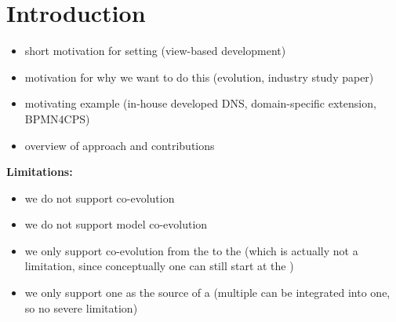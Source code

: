 \section{Introduction}
\label{sec:Introduction}

\begin{itemize}
    \item short motivation for setting (view-based development)
    \item motivation for why we want to do this (\metamodel evolution, industry study paper)
    \item motivating example (in-house developed DNS, domain-specific \metamodel extension, BPMN4CPS)
    \item overview of approach and contributions
\end{itemize}

\textbf{Limitations:}
\begin{itemize}
    \item we do not support \metamodel \metamodel co-evolution
    \item we do not support \metamodel model co-evolution
    \item we only support co-evolution from the \metamodel to the \viewtype (which is actually not a limitation, since conceptually one can still start at the \viewtype)
    \item we only support one \metamodel as the source of a \viewtype (multiple \metamodels can be integrated into one, so no severe limitation)
\end{itemize}
